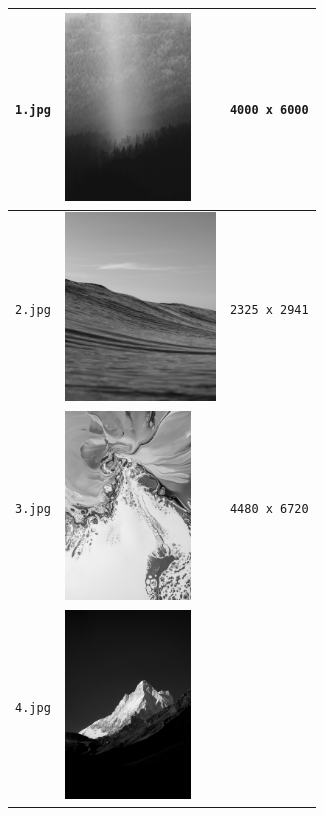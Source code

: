 \begin{longtable}{|c|p{5.5cm}|c|}
  \texttt{1.jpg} & \begin{minipage}{.3\textwidth}
    \includegraphics[height=5cm]{chapters/res/appendix-5/1.jpg}
  \end{minipage} & \texttt{4000 x 6000} \\ \hline
  \texttt{2.jpg} & \begin{minipage}{.3\textwidth}
    \includegraphics[height=5cm]{chapters/res/appendix-5/2.jpg}
  \end{minipage} & \texttt{2325 x 2941}  \\ \hline
  \texttt{3.jpg} &\begin{minipage}{.3\textwidth}
    \includegraphics[height=5cm]{chapters/res/appendix-5/3.jpg}
  \end{minipage} & \texttt{4480 x 6720} \\ \hline
  \texttt{4.jpg} & \begin{minipage}{.3\textwidth}
    \includegraphics[height=5cm]{chapters/res/appendix-5/4.jpg}

\end{minipage}
\end{longtable}
